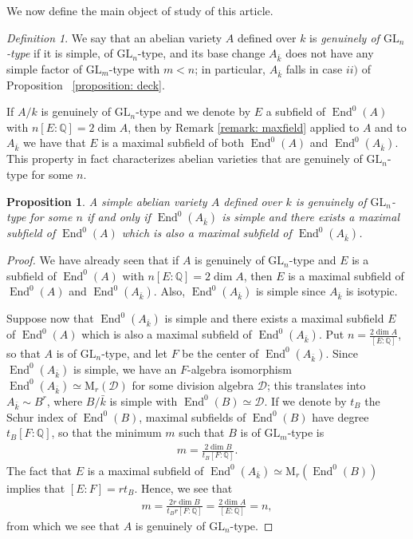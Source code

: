 \documentclass[oneside]{amsart}
\newtheorem{proposition}[theorem]{Proposition}
\theoremstyle{remark}
\newtheorem{definition}[theorem]{Definition}
\newcommand{\Q}{\mathbb Q}
\newcommand{\kbar}{{\bar{k}}}
\newcommand{\GL}{\mathrm{GL}}
\newcommand{\M}{\mathrm{M }}
\newcommand{\End}{\operatorname{End}}
\numberwithin{equation}{section}
\begin{document}
We now define the main object of study of this article.

\begin{definition}
  We say that an abelian variety $A$ defined over $k$ is \emph{genuinely of $\GL_n$-type} if it is simple, of $\GL_n$-type, and its base change $A_\kbar$ does not have any simple factor of $\GL_m$-type with $m<n$; in particular, $A_\kbar$ falls in case $ii)$ of Proposition~ \ref{proposition: deck}. 
\end{definition}

 If $A/k$ is genuinely of $\GL_n$-type and we denote by $E$ a subfield of $\End^0(A)$ with $n[E\colon \Q]=2\dim A$, then by Remark \ref{remark: maxfield} applied to $A$ and to $A_{\kbar}$ we have that $E$ is a maximal subfield of both $\End^0(A)$ and $\End^0(A_\kbar)$. This property in fact characterizes abelian varieties that are genuinely of $\GL_n$-type for some $n$.

\begin{proposition}\label{prop:maximal of both}
  A simple abelian variety $A$ defined over $k$ is genuinely of $\GL_n$-type for some $n$ if and only if $\End^0(A_\kbar)$ is simple and there exists a maximal subfield of $\End^0(A)$ which is also a maximal subfield of $\End^0(A_\kbar)$.
\end{proposition}
\begin{proof}
  We have already seen that if $A$ is genuinely of $\GL_n$-type and $E$ is a subfield of $\End^0(A)$ with $n[E\colon \Q]=2\dim A$, then $E$ is a maximal subfield of $\End^0(A)$ and $\End^0(A_{\kbar})$. Also, $\End^0(A_\kbar)$ is simple since $A_\kbar$ is isotypic. 

  Suppose now that $\End^0(A_\kbar)$ is simple and there exists a maximal subfield $E$ of $\End^0(A)$ which is also a maximal subfield of $\End^0(A_\kbar)$. Put $n = \frac{2\dim A}{[E\colon \Q]}$, so that $A$ is of $\GL_n$-type, and let $F$ be the center of $\End^0(A_\kbar)$. Since $\End^0(A_\kbar)$ is simple, we have an $F$-algebra isomorphism $\End^0(A_\kbar)\simeq \M_r(\mathcal{D})$ for some division algebra $\mathcal{D}$; this translates into $A_\kbar\sim B^r$, where $B/\kbar$ is simple with $\End^0(B)\simeq \mathcal{D}$. If we denote by $t_B$ the Schur index of $\End^0(B)$, maximal subfields of $\End^0(B)$ have degree $t_B[F\colon \Q]$, so that the minimum $m$ such that $B$ is of $\GL_m$-type is
  \begin{align*}
    m = \frac{2\dim B}{t_B[F\colon \Q]}.
  \end{align*}
  The fact that $E$ is a maximal subfield of $\End^0(A_\kbar)\simeq \M_r(\End^0(B))$ implies that $[E\colon F]= r t_B$. Hence, we see that
  \begin{align*}
    m = \frac{2r\dim B}{t_Br[F\colon \Q]}= \frac{2\dim A}{[E\colon\Q]} = n,
  \end{align*}
  from which we see that $A$ is genuinely of $\GL_n$-type.
\end{proof}
\end{document}
